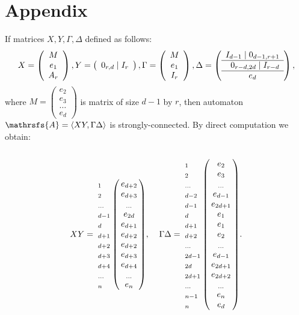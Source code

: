 \documentclass[11pt]{llncs}
\newcommand{\A}{\mathrsfs{A}}
\newcommand{\G}{\Gamma}
\newcommand{\D}{\Delta}
\begin{document}
\section*{Appendix}
If matrices $X,Y,\G,\D$ defined as follows:
$$
X =
\left(
\begin{array}{c}
M \\
e_1 \\
A_r
\end{array}
\right),
Y = 
\left(
\begin{array}{c}
0_{r,d} \mid I_r
\end{array}
\right),
\G = 
\left(
\begin{array}{c}
M \\
e_1 \\
I_r
\end{array}
\right),
\D = 
\left(
\begin{array}{c}
I_{d - 1} \mid 0_{d-1,r + 1} \\ \hline
\textbf{\,\,\,} 0_{r-d,2d} \mid I_{r - d} \\ \hline
e_d
\end{array}
\right),
$$
where $M =
\left(
\begin{smallmatrix}
e_2\\
e_3\\
\ldots\\
e_d
\end{smallmatrix}\right)$ is matrix of size $d - 1$ by $r$,
then automaton $\A = \langle XY, \G\D\rangle$ is strongly-connected.
By direct computation we obtain:
$$
XY = 
\bordermatrix{    ~  &    ~     \cr
                  _1 & e_{d+2}  \cr
                  _2 & e_{d+3}  \cr
                  _{\ldots} & _{\ldots} \cr
                  _{d - 1} & e_{2d}  \cr
                  _d & e_{d+1}  \cr
                  _{d+1} & e_{d+2}  \cr
                  _{d+2} & e_{d+2}  \cr
                  _{d+3} & e_{d+3}  \cr
                  _{d+4} & e_{d+4}  \cr
                  _{\ldots} & _{\ldots} \cr
                  _{n} & e_{n}  \cr  
             }, \;\;\;\;
\G\D =             
\bordermatrix{    ~  &    ~     \cr
                  _1 & e_{2}  \cr
                  _2 & e_{3}  \cr
                  _{\ldots} & _{\ldots} \cr
                  _{d - 2} & e_{d - 1}  \cr
                  _{d - 1} & e_{2d + 1}  \cr
                  _d & e_{1}  \cr
                  _{d+1} & e_{1}  \cr
                  _{d+2} & e_{2}  \cr
                  _{\ldots} & _{\ldots} \cr
                  _{2d-1} & e_{d-1}  \cr
                  _{2d} & e_{2d+1}  \cr
                  _{2d+1} & e_{2d+2}  \cr
                  _{\ldots} & _{\ldots} \cr
                  _{n-1} & e_{n}  \cr
                  _{n} & e_{d}  \cr  
             }.
$$
\end{document}
